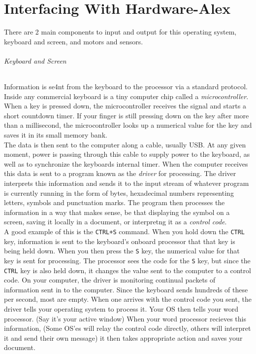 \documentclass[english]{article}
\begin{document}
\part{Interfacing With Hardware-Alex}
There are 2 main components to input and output for this operating system, keyboard and screen, and motors and sensors.
\paragraph{Keyboard and Screen}
Information is se4nt from the keyboard to the processor via a standard protocol. Inside any commercial keyboard is a tiny computer chip
called a {\it microcontroller}. When a key is pressed down, the microcontroller receives the signal and starts a short countdown timer. If your finger is still pressing down on the key after more than a millisecond, the microcontroller looks up a numerical value for the key
and saves it in its small memory bank.
\break
\\The data is then sent to the computer along a cable, usually USB. At any given moment, power
is passing through this cable to supply power to the keyboard, as well as to synchronize the keyboards internal timer. When the
computer receives this data is sent to a program known as the {\it driver} for processing. The driver interprets this information
and sends it to the input stream of whatever program is currently running in the form of bytes, hexadecimal numbers representing
letters, symbols and punctuation marks. The program then processes the information in a way that makes sense, be that displaying
the symbol on a screen, saving it locally in a document, or interpretng it as a {\it control code}.
\break
\\A good example of this is the \texttt{CTRL+S} command. When you hold down the \texttt{CTRL} key, information is sent to the keyboard's onboard processor that that key is being held down. When you then press the \texttt{S} key, the numerical value for that key is sent for processing. The processor sees the code for the \texttt{S} key, but since the \texttt{CTRL} key is also held down, it changes the value sent to the computer to a control code. On your computer, the driver is monitoring continual packets of information sent in to the computer. Since the keyboard sends hundreds of these per second, most are empty. When one arrives with the control code you sent, the driver tells your operating system to process it. Your OS then tells your word processor. (Say it's your active window) When your word processor recieves this information, (Some OS'es will relay the control code directly, others will interpret it and send their own message) it then takes appropriate action and saves your document.
\end{document}
